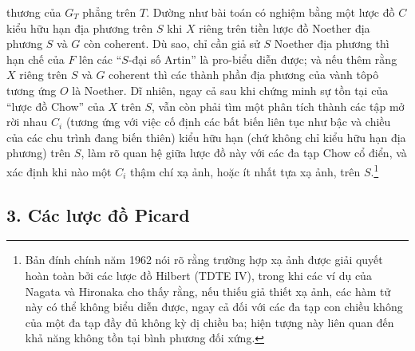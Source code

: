 \documentclass[11pt,twoside,openany]{book}
\numberwithin{equation}{section}
\newcommand{\src}[1]{%
  \phantomsection\hypertarget{src:\fgasourceid:#1}{}%
  \marginpar{\raggedleft\footnotesize\sffamily #1}%
}
\newcommand{\fgasourceid}{unset}
\begin{document}
\src{383}
thương của $G_T$ phẳng trên $T$. Dường như bài toán có nghiệm bằng một lược đồ
$C$ kiểu hữu hạn địa phương trên $S$ khi $X$ riêng trên tiền lược đồ Noether
địa phương $S$ và $G$ còn coherent. Dù sao, chỉ cần giả sử $S$ Noether địa
phương thì hạn chế của $F$ lên các ``$S$-đại số Artin'' là pro-biểu diễn được;
và nếu thêm rằng $X$ riêng trên $S$ và $G$ coherent thì các thành phần địa
phương của vành tôpô tương ứng $O$ là Noether. Dĩ nhiên, ngay cả sau khi chứng
minh sự tồn tại của ``lược đồ Chow'' của $X$ trên $S$, vẫn còn phải tìm một
phân tích thành các tập mở rời nhau $C_i$ (tương ứng với việc cố định các bất
biến liên tục như bậc và chiều của các chu trình đang biến thiên) kiểu hữu hạn
(chứ không chỉ kiểu hữu hạn địa phương) trên $S$, làm rõ quan hệ giữa lược đồ
này với các đa tạp Chow cổ điển, và xác định khi nào một $C_i$ thậm chí xạ ảnh,
hoặc ít nhất tựa xạ ảnh, trên $S$.\footnote{Bản đính chính năm 1962 nói rõ rằng
trường hợp xạ ảnh được giải quyết hoàn toàn bởi các lược đồ Hilbert (TDTE IV),
trong khi các ví dụ của Nagata và Hironaka cho thấy rằng, nếu thiếu giả thiết
xạ ảnh, các hàm tử này có thể không biểu diễn được, ngay cả đối với các đa tạp
con chiều không của một đa tạp đầy đủ không kỳ dị chiều ba; hiện tượng này liên
quan đến khả năng không tồn tại bình phương đối xứng.}

\subsection*{3. Các lược đồ Picard}
\end{document}
